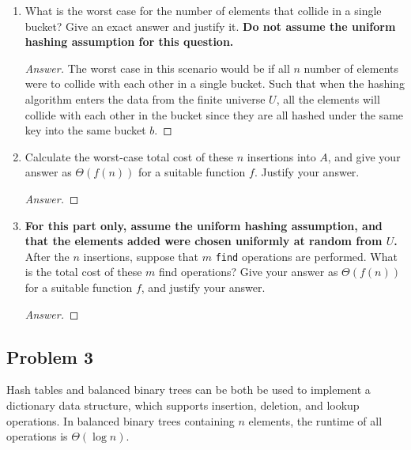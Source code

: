 \documentclass[11pt]{article}
\theoremstyle{definition}
\theoremstyle{definition}
\theoremstyle{definition}
\begin{document}
	\begin{enumerate}[label=(\alph*)]
	  \item What is the worst case for the number of elements that collide in a single bucket? Give an exact answer and justify it.     \textbf{Do not assume the uniform hashing assumption for this question.}

    \begin{proof}[Answer]
    The worst case in this scenario would be if all $n$ number of elements were to collide with each other in a single bucket. Such that when the hashing algorithm enters the data from the finite universe $U$, all the elements will collide with each other in the bucket since they are all hashed under the same key into the same bucket $b$.
    \end{proof}

\vfill
	  \item Calculate the worst-case total cost of these $n$ insertions into $A$, and give your answer as $\Theta(f(n))$ for a suitable function $f$. Justify your answer.

    \begin{proof}[Answer]
    \end{proof}
    
    \vfill
	
	\item \textbf{For this part only, assume the uniform hashing assumption, and that the elements added were chosen uniformly at random from $U$.} After the $n$ insertions, suppose that $m$ \texttt{find} operations are performed. What is the total cost of these $m$ find operations? Give your answer as $\Theta(f(n))$ for a suitable function $f$, and justify your answer.
    \begin{proof}[Answer]
    \end{proof}

\vfill
	\end{enumerate} 

\newpage
\subsection{Problem 3}
Hash tables and balanced binary trees can be both be used to implement a dictionary data structure, which supports insertion, deletion, and lookup operations. In balanced binary trees containing $n$ elements, the runtime of all operations is $\Theta(\log n)$.  \\
\end{document}
